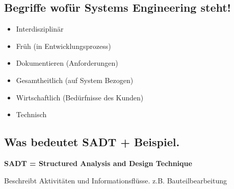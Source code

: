 \subsection{Begriffe wofür Systems Engineering steht!}
\begin{itemize}[itemsep=0pt, topsep=10pt]
    \item Interdisziplinär
    \item Früh (in Entwicklungsprozess)
    \item Dokumentieren (Anforderungen)
    \item Gesamtheitlich (auf System Bezogen)
    \item Wirtschaftlich (Bedürfnisse des Kunden)
    \item Technisch
\end{itemize}

\subsection{Was bedeutet SADT + Beispiel.}
\textbf{SADT = Structured Analysis and Design Technique}

Beschreibt Aktivitäten und Informationsflüsse. z.B. Bauteilbearbeitung

